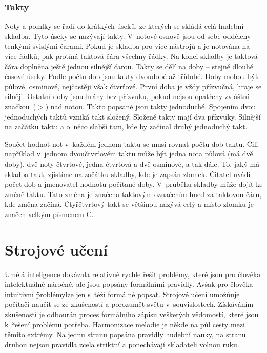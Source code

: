 \subsection{Takty}
Noty a pomlky se řadí do krátkých úseků, 
ze kterých se skládá celá hudební skladba.
Tyto úseky se nazývají takty.
V~notové osnově jsou od sebe odděleny tenkými svislými čarami.
Pokud je skladba pro více nástrojů a je notována na více řádků, 
pak protíná taktová čára všechny řádky.
Na konci skladby je taktová čára doplněna ještě jednou silnější čarou. 
Takty se dělí na doby -- stejně dlouhé časové úseky.
Podle počtu dob jsou takty dvoudobé až třídobé.
Doby mohou být půlové, osminové, nejčastěji však čtvrťové.
První doba je vždy přízvučná, hraje se silněji.
Ostatní doby jsou hrány bez přízvuku, 
pokud nejsou opatřeny zvláštní značkou~($>$) nad notou.
Takto popsané jsou takty jednoduché.
Spojením dvou jednoduchých taktů vzniká takt složený.
Složené takty mají dva přízvuky.
Silnější na začátku taktu a o~něco slabší tam, 
kde by začínal druhý jednoduchý takt.
\par

Součet hodnot not v~každém jednom taktu se musí rovnat počtu dob taktu.
Čili například v~jednom  dvoučtvrťovém taktu 
může být jedna nota půlová (má dvě doby), 
dvě noty čtvrťové, jedna čtvrťová a dvě osminové, a tak dále.
To, jaký má skladba takt, zjistíme na začátku skladby, kde je zapsán zlomek.
Čitatel uvádí počet dob a jmenovatel hodnotu počítané doby.
V~průběhu skladby může dojít ke změně taktu.
Tato změna je značena taktovým označením hned za taktovou čáru, 
kde změna začíná.
Čtyřčtvrťový takt se většinou nazývá celý 
a místo zlomku je značen velkým písmenem C.
\cite{cmiral,zenkl}

\chapter{Strojové učení}
Umělá inteligence dokázala relativně rychle řešit problémy, 
které jsou pro člověka intelektuálně náročné, 
ale jsou popsány formálními pravidly.
Avšak pro člověka intuitivní \"problémy\" lze jen s~těží formálně popsat.
Strojové učení umožňuje počítači naučit se ze zkušeností
a porozumět světu v~souvislostech.
Získáváním zkušeností je odbourán proces formálního zápisu veškerých vědomostí,
které jsou k~řešení problému potřeba.
\cite{Goodfellow-et-al-2016}
Harmonizace melodie je někde na půl cesty mezi těmito extrémy.
Na jednu stranu popsána pravidly hudební nauky,
na stranu druhou nejsou pravidla zcela striktní 
a ponechávají skladateli volnou ruku.
\par

